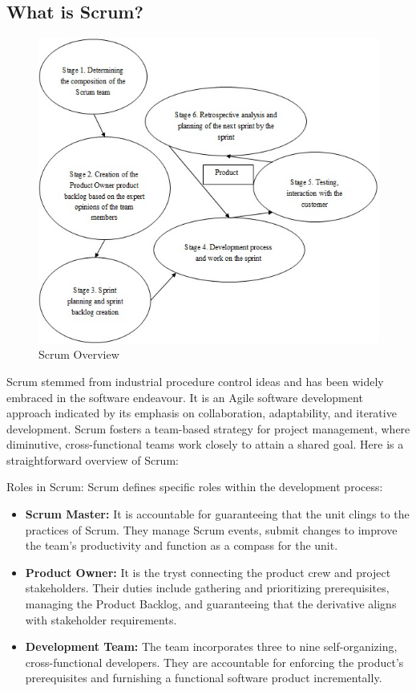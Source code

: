 \documentclass[conference]{IEEEtran}
\begin{document}
\subsection{What is Scrum?}
\begin{figure}[h!]
    \centering
    \includegraphics[width=1\linewidth]{s1.jpg}
    \caption{Scrum Overview}
    \label{fig:Scrum}
\end{figure}



Scrum stemmed from industrial procedure control ideas and has been widely embraced in the software endeavour. It is an Agile software development approach indicated by its emphasis on collaboration, adaptability, and iterative development. Scrum fosters a team-based strategy for project management, where diminutive, cross-functional teams work closely to attain a shared goal. Here is a straightforward overview of Scrum\cite{schwaber1997scrum}:


Roles in Scrum:
Scrum defines specific roles within the development process:

\begin{itemize}
\item \textbf{Scrum Master:} It is accountable for guaranteeing that the unit clings to the practices of Scrum. They manage Scrum events, submit changes to improve the team's productivity and function as a compass for the unit\cite{schwaber1997scrum}.

\item \textbf{Product Owner:} It is the tryst connecting the product crew and project stakeholders. Their duties include gathering and prioritizing prerequisites, managing the Product Backlog, and guaranteeing that the derivative aligns with stakeholder requirements\cite{rising2000scrum}.

\item \textbf{Development Team:} The team incorporates three to nine self-organizing, cross-functional developers. They are accountable for enforcing the product's prerequisites and furnishing a functional software product incrementally\cite{rising2000scrum}.
\end{itemize}
\end{document}
